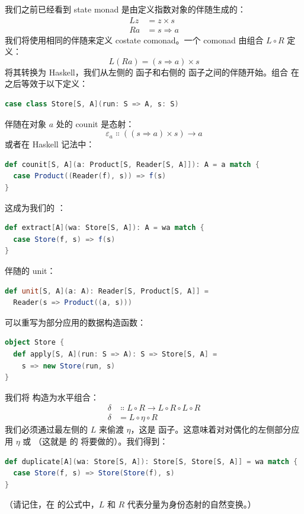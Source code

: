 我们之前已经看到 state monad 是由定义指数对象的伴随生成的：
\begin{align*}
  L z & = z\times{}s      \\
  R a & = s \Rightarrow a
\end{align*}
我们将使用相同的伴随来定义 costate comonad。一个 comonad 由组合 $L \circ R$ 定义：
\[L (R a) = (s \Rightarrow a)\times{}s\]
将其转换为 Haskell，我们从左侧的  函子和右侧的  函子之间的伴随开始。组合  在  之后等效于以下定义：

\begin{lstlisting}[language=Scala]
case class Store[S, A](run: S => A, s: S)
\end{lstlisting}
伴随在对象 $a$ 处的 counit 是态射：
\[\varepsilon_a \Colon ((s \Rightarrow a)\times{}s) \to a\]
或者在 Haskell 记法中：

\begin{lstlisting}[language=Scala]
def counit[S, A](a: Product[S, Reader[S, A]]): A = a match {
  case Product((Reader(f), s)) => f(s)
}
\end{lstlisting}
这成为我们的 ：

\begin{lstlisting}[language=Scala]
def extract[A](wa: Store[S, A]): A = wa match {
  case Store(f, s) => f(s)
}
\end{lstlisting}
伴随的 unit：

\begin{lstlisting}[language=Scala]
def unit[S, A](a: A): Reader[S, Product[S, A]] =
  Reader(s => Product((a, s)))
\end{lstlisting}
可以重写为部分应用的数据构造函数：

\begin{lstlisting}[language=Scala]
object Store {
  def apply[S, A](run: S => A): S => Store[S, A] =
    s => new Store(run, s)
}
\end{lstlisting}
我们将  构造为水平组合：
\begin{align*}
  \delta & \Colon L \circ R \to L \circ R \circ L \circ R \\
  \delta & = L \circ \eta \circ R
\end{align*}
我们必须通过最左侧的 $L$ 来偷渡 $\eta$，这是  函子。这意味着对对偶化的左侧部分应用 $\eta$ 或 （这就是  的  将要做的）。我们得到：

\begin{lstlisting}[language=Scala]
def duplicate[A](wa: Store[S, A]): Store[S, Store[S, A]] = wa match {
  case Store(f, s) => Store(Store(f), s)
}
\end{lstlisting}
（请记住，在  的公式中，$L$ 和 $R$ 代表分量为身份态射的自然变换。）

